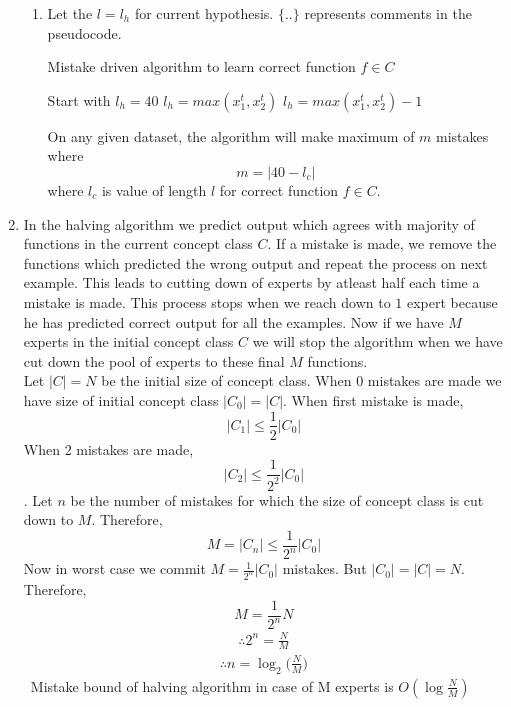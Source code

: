 \begin{enumerate}
\begin{enumerate}
		\item 
		Let the $l = l_h$ for current hypothesis. $\{ .. \}$ represents comments in the pseudocode.\\
		\begin{algorithm}
			\caption{Mistake driven algorithm to learn correct function $f \in C$}
			\begin{algorithmic}
				\STATE Start with $l_h = 40$ 
							\STATE $l_h = max(x_1^t, x_2^t)$ 
						\ELSE
							\STATE $l_h = max(x_1^t, x_2^t) - 1$ 
						\ENDIF				
					\ENDIF 
				\ENDFOR
			\end{algorithmic}	
		\end{algorithm}
	
	On any given dataset, the algorithm will make maximum of $m$ mistakes where $$m = |40 - l_c|$$ where $l_c$ is value of length $l$ for correct function $f \in C$.
	
	\end{enumerate}	    
    
     	 
    
    

    \item
		In the halving algorithm we predict output which agrees with majority of functions in the current concept class $C$. If a mistake is made, we remove the functions which predicted the wrong output and repeat the process on next example. This leads to cutting down of experts by atleast half      each time a mistake is made. This process stops when we reach down to $1$ expert because he has predicted correct output for all the examples. Now if we have $M$ experts in the initial concept class $C$ we will stop the algorithm when we have cut down the pool of experts  to these final $M$ functions.\\
		Let $|C| = N$ be the initial size of concept class. When $0$ mistakes are made we have size of initial concept class $|C_0| = |C|$. When first mistake is made, $$|C_1| \leq \frac{1}{2}|C_0|$$ When 2 mistakes are made, $$|C_2| \leq \frac{1}{2^2}|C_0|$$. Let $n$ be the number of mistakes for which the size of concept class is cut down to $M$. Therefore, $$M = |C_n| \leq \frac{1}{2^n}|C_0|$$
		Now in worst case we commit $M =  \frac{1}{2^n}|C_0|$ mistakes. But $|C_0| = |C| = N$. Therefore,
		$$M = \frac{1}{2^n}N$$
		\begin{align*}
			\therefore 2^n = \frac{N}{M}
		\end{align*}
		\begin{align*}
			\therefore n = \log_2 \bigg(\frac{N}{M}\bigg)    
		\end{align*}
		\therefore \ Mistake bound of halving algorithm in case of M experts is $O(\log \frac{N}{M})$
\end{enumerate}


